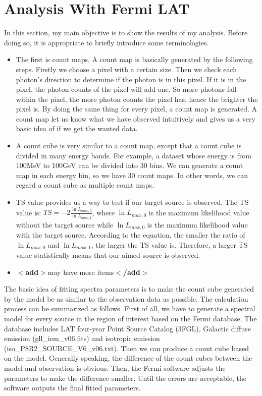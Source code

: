 \documentclass[12pt]{report}
\newcommand{\add}[1]{
  $<$\textbf{add}$>$#1$<$\textbf{/add}$>$
}
\begin{document}
      \section{Analysis With Fermi LAT}
        In this section, my main objective is to show the results of my analysis. Before doing so, it is 
        appropriate to briefly introduce some terminologies. 
        \begin{itemize}
          \item The first is count maps. A count map is basically generated by the following steps. Firstly we choose a 
            pixel with a certain size. Then we check each photon's direction to determine if the photon is in this 
            pixel. If it is in the pixel, the photon counts of the pixel will add one. So more photons fall within 
            the pixel, the more photon counts the pixel has, hence the brighter the pixel is. By doing the same thing 
            for every pixel, a count map is generated. A count map let us know what we have observed intuitively and 
            gives us a very basic idea of if we get the wanted data. 
          \item A count cube is very similar to a count map, except that a count cube is divided in many energy
            bands. For example, a dataset whose energy is from 100MeV to 100GeV can be divided into 30 bins. We can
            generate a count map in each energy bin, so we have 30 count maps. In other words, we can regard a 
            count cube as multiple count maps. 
          \item TS value provides us a way to test if our target source is observed. The TS value is: 
            $TS = -2 \frac{\ln{L_{max, 0}}}{\ln{L_{max, 1}}}$, where $\ln{L_{max, 0}}$ is the maximum likelihood value 
            without the target source while $\ln{L_{max, 0}}$ is the maximum likelihood value with the target source.
            According to the equation, the smaller the ratio of $\ln{L_{max, 0}}$ and $\ln{L_{max, 1}}$, the larger
            the TS value is. Therefore, a larger TS value statistically means that our aimed source is observed. 
          \item \add{may have more items}
        \end{itemize}

        The basic idea of fitting spectra parameters is to make the count cube generated by the model be as similar 
        to the observation data as possible. The calculation process can be summarized as follows. First of all, we 
        have to generate a spectral model for every source in the region of interest based on the Fermi database.
        The database includes LAT four-year Point Source Catalog (3FGL), Galactic diffuse emission (gll\_iem\_v06.fits)
        and isotropic emission (iso\_P8R2\_SOURCE\_V6\_v06.txt). 
        Then we can produce a count cube based on the model. Generally speaking, the difference of the 
        count cubes between the model and observation is obvious. Then, the Fermi software adjusts the parameters 
        to make the difference smaller. Until the errors are acceptable, the software outputs the final fitted 
        parameters.  
\end{document}
